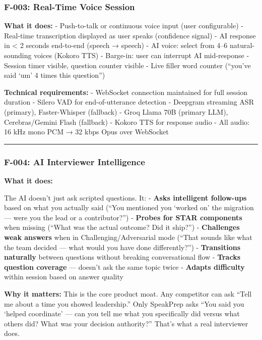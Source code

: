 \documentclass[
  11pt,
]{article}
\begin{document}
\hypertarget{f-003-real-time-voice-session}{%
\subsubsection{F-003: Real-Time Voice
Session}\label{f-003-real-time-voice-session}}

\textbf{What it does:} - Push-to-talk or continuous voice input (user
configurable) - Real-time transcription displayed as user speaks
(confidence signal) - AI response in \textless{} 2 seconds end-to-end
(speech → speech) - AI voice: select from 4--6 natural-sounding voices
(Kokoro TTS) - Barge-in: user can interrupt AI mid-response - Session
timer visible, question counter visible - Live filler word counter
(``you've said `um' 4 times this question'')

\textbf{Technical requirements:} - WebSocket connection maintained for
full session duration - Silero VAD for end-of-utterance detection -
Deepgram streaming ASR (primary), Faster-Whisper (fallback) - Groq Llama
70B (primary LLM), Cerebras/Gemini Flash (fallback) - Kokoro TTS for
response audio - All audio: 16 kHz mono PCM → 32 kbps Opus over
WebSocket

\begin{center}\rule{0.5\linewidth}{0.5pt}\end{center}

\hypertarget{f-004-ai-interviewer-intelligence}{%
\subsubsection{F-004: AI Interviewer
Intelligence}\label{f-004-ai-interviewer-intelligence}}

\textbf{What it does:}

The AI doesn't just ask scripted questions. It: - \textbf{Asks
intelligent follow-ups} based on what you actually said (``You mentioned
you `worked on' the migration --- were you the lead or a contributor?'')
- \textbf{Probes for STAR components} when missing (``What was the
actual outcome? Did it ship?'') - \textbf{Challenges weak answers} when
in Challenging/Adversarial mode (``That sounds like what the team
decided --- what would you have done differently?'') -
\textbf{Transitions naturally} between questions without breaking
conversational flow - \textbf{Tracks question coverage} --- doesn't ask
the same topic twice - \textbf{Adapts difficulty} within session based
on answer quality

\textbf{Why it matters:} This is the core product moat. Any competitor
can ask ``Tell me about a time you showed leadership.'' Only SpeakPrep
asks ``You said you `helped coordinate' --- can you tell me what you
specifically did versus what others did? What was your decision
authority?'' That's what a real interviewer does.
\end{document}
